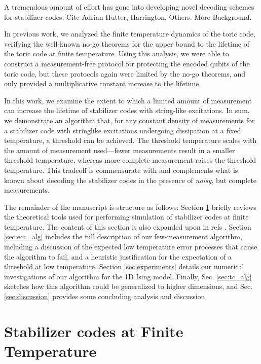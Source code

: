 \documentclass[twocolumn,superscriptaddress,aps,prb,floatfix]{revtex4-1}
\begin{document}
 A tremendous amount of effort has gone into developing novel decoding schemes for stabilizer codes.  Cite Adrian Hutter, Harrington, Others.  More Background.
 
 In previous work, we analyzed the finite temperature dynamics of the toric code, verifying the well-known no-go theorems for the upper bound to the lifetime of the toric code at finite temperature.  Using this analysis, we were able to construct a measurement-free protocol for protecting the encoded qubits of the toric code, but these protocols again were limited by the no-go theorems, and only provided a multiplicative constant increase to the lifetime.  
 
 In this work, we examine the extent to which a limited amount of measurement can increase the lifetime of stabilizer codes with string-like excitations.  In sum, we demonstrate an algorithm that, for any constant density of measurements for a stabilizer code with stringlike excitations undergoing dissipation at a fixed temperature, a threshold can be achieved.  The threshold temperature scales with the amount of measurement used---fewer measurements result in a smaller threshold temperature, whereas more complete measurement raises the threshold temperature.  This tradeoff is commensurate with and complements what is known about decoding the stabilizer codes in the presence of \emph{noisy}, but complete measurements.
 
 The remainder of the manuscript is structure as follows:  Section \ref{sec:stabfintemp} briefly reviews the theoretical tools used for performing simulation of stabilizer codes at finite temperature.  The content of this section is also expanded upon in refs \cite{Freeman2014,Freeman2016}.  Section \ref{sec:ecc_alg} includes the full description of our few-measurement algorithm, including a discussion of the expected low temperature error processes that cause the algorithm to fail, and a heuristic justification for the expectation of a threshold at low temperature.  Section \ref{sec:experiments} details our numerical investigations of our algorithm for the 1D Ising model.  Finally, Sec. \ref{sec:tc_alg} sketches how this algorithm could be generalized to higher dimensions, and Sec. \ref{sec:discussion} provides some concluding analysis and discussion.
 
 
 
 
\section{Stabilizer codes at Finite Temperature}
\label{sec:stabfintemp}
\end{document}
